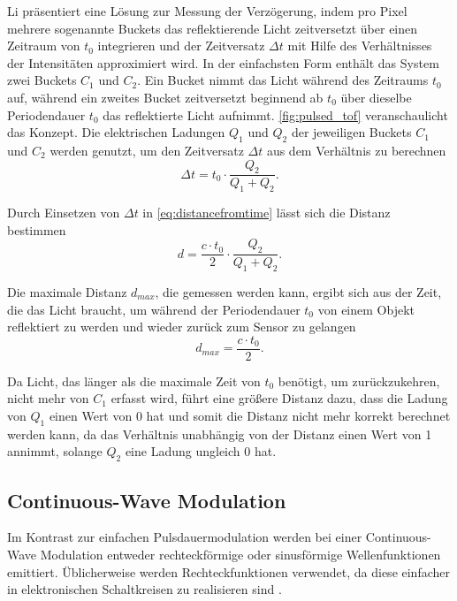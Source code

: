 \documentclass[thesis.tex]{subfiles}
\begin{document}
Li \cite{bib:Li2014} präsentiert eine Lösung zur Messung der Verzögerung, indem pro Pixel mehrere sogenannte Buckets das reflektierende Licht zeitversetzt über einen Zeitraum von $t_0$ integrieren und der Zeitversatz $\Delta t$ mit Hilfe des Verhältnisses der Intensitäten approximiert wird. In der einfachsten Form enthält das System zwei Buckets $C_1$ und $C_2$. Ein Bucket nimmt das Licht während des Zeitraums $t_0$ auf, während ein zweites Bucket zeitversetzt beginnend ab $t_0$ über dieselbe Periodendauer $t_0$ das reflektierte Licht aufnimmt. \autoref{fig:pulsed_tof} veranschaulicht das Konzept. Die elektrischen Ladungen $Q_1$ und $Q_2$ der jeweiligen Buckets $C_1$ und $C_2$ werden genutzt, um den Zeitversatz $\Delta t$ aus dem Verhältnis zu berechnen \begin{equation}\Delta t = t_0 \cdot \frac{Q_2}{Q_1 + Q_2}.\end{equation}

Durch Einsetzen von $\Delta t$ in \autoref{eq:distancefromtime} lässt sich die Distanz bestimmen \begin{equation}d = \frac{c \cdot t_0}{2} \cdot \frac{Q_2}{Q_1 + Q_2}.\end{equation}

Die maximale Distanz $d_{max}$, die gemessen werden kann, ergibt sich aus der Zeit, die das Licht braucht, um während der Periodendauer $t_0$ von einem Objekt reflektiert zu werden und wieder zurück zum Sensor zu gelangen \begin{equation}d_{max} = \frac{c \cdot t_0}{2}.\end{equation}

Da Licht, das länger als die maximale Zeit von $t_0$ benötigt, um zurückzukehren, nicht mehr von $C_1$ erfasst wird, führt eine größere Distanz dazu, dass die Ladung von $Q_1$ einen Wert von 0 hat und somit die Distanz nicht mehr korrekt berechnet werden kann, da das Verhältnis unabhängig von der Distanz einen Wert von 1 annimmt, solange $Q_2$ eine Ladung ungleich 0 hat.

\subsection{Continuous-Wave Modulation}\label{chap:cw_tof}

Im Kontrast zur einfachen Pulsdauermodulation werden bei einer Continuous-Wave Modulation entweder rechteckförmige oder sinusförmige Wellenfunktionen emittiert. Üblicherweise werden Rechteckfunktionen verwendet, da diese einfacher in elektronischen Schaltkreisen zu realisieren sind \cite{bib:Li2014}.
\end{document}
